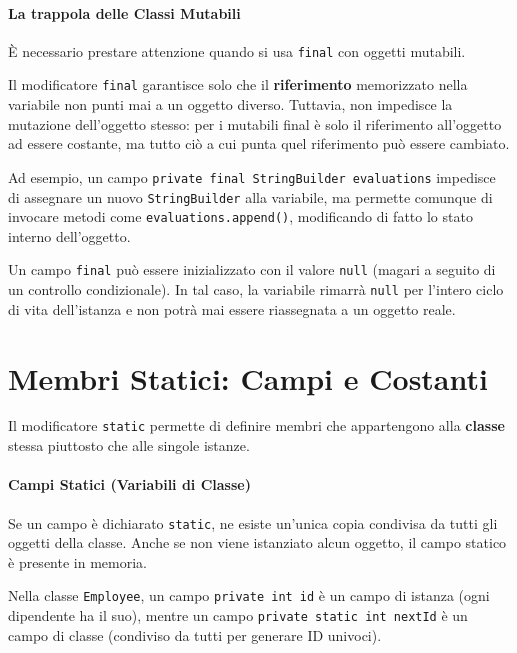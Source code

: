 \paragraph{La trappola delle Classi Mutabili}
È necessario prestare attenzione quando si usa \texttt{final} con oggetti mutabili. 

\begin{warningbox}[]
    Il modificatore \texttt{final} garantisce solo che il \textbf{riferimento} memorizzato nella variabile non punti mai a un oggetto diverso. Tuttavia, non impedisce la mutazione dell'oggetto stesso: per i mutabili final è solo il riferimento all'oggetto ad essere costante, ma tutto ciò a cui punta quel riferimento può essere cambiato.
\end{warningbox}

Ad esempio, un campo \texttt{private final StringBuilder evaluations} impedisce di assegnare un nuovo \texttt{StringBuilder} alla variabile, ma permette comunque di invocare metodi come \texttt{evaluations.append()}, modificando di fatto lo stato interno dell'oggetto.

\begin{observation}
    Un campo \texttt{final} può essere inizializzato con il valore \texttt{null} (magari a seguito di un controllo condizionale). In tal caso, la variabile rimarrà \texttt{null} per l'intero ciclo di vita dell'istanza e non potrà mai essere riassegnata a un oggetto reale.
\end{observation}

\section{Membri Statici: Campi e Costanti}

Il modificatore \texttt{static} permette di definire membri che appartengono alla \textbf{classe} stessa piuttosto che alle singole istanze. 

\paragraph{Campi Statici (Variabili di Classe)}
Se un campo è dichiarato \texttt{static}, ne esiste un'unica copia condivisa da tutti gli oggetti della classe. Anche se non viene istanziato alcun oggetto, il campo statico è presente in memoria.

\begin{example}
    Nella classe \texttt{Employee}, un campo \texttt{private int id} è un campo di istanza (ogni dipendente ha il suo), mentre un campo \texttt{private static int nextId} è un campo di classe (condiviso da tutti per generare ID univoci).
\end{example}

